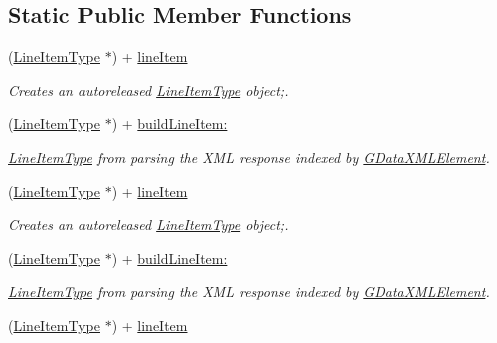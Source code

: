 \subsection*{Static Public Member Functions}
\begin{DoxyCompactItemize}
\item 
(\hyperlink{interface_line_item_type}{LineItemType} $\ast$) + \hyperlink{interface_line_item_type_a3d39c24f1bfd7807333c2a7480beabd5}{lineItem}
\begin{DoxyCompactList}\small\item\em Creates an autoreleased \hyperlink{interface_line_item_type}{LineItemType} object;. \item\end{DoxyCompactList}\item 
(\hyperlink{interface_line_item_type}{LineItemType} $\ast$) + \hyperlink{interface_line_item_type_ab88b17b872d7f5d0cb8875b8bd9bec95}{buildLineItem:}
\begin{DoxyCompactList}\small\item\em \hyperlink{interface_line_item_type}{LineItemType} from parsing the XML response indexed by \hyperlink{interface_g_data_x_m_l_element}{GDataXMLElement}. \item\end{DoxyCompactList}\item 
(\hyperlink{interface_line_item_type}{LineItemType} $\ast$) + \hyperlink{interface_line_item_type_a3d39c24f1bfd7807333c2a7480beabd5}{lineItem}
\begin{DoxyCompactList}\small\item\em Creates an autoreleased \hyperlink{interface_line_item_type}{LineItemType} object;. \item\end{DoxyCompactList}\item 
(\hyperlink{interface_line_item_type}{LineItemType} $\ast$) + \hyperlink{interface_line_item_type_a1c4b1049a9982dd49c15debfad0df9b5}{buildLineItem:}
\begin{DoxyCompactList}\small\item\em \hyperlink{interface_line_item_type}{LineItemType} from parsing the XML response indexed by \hyperlink{interface_g_data_x_m_l_element}{GDataXMLElement}. \item\end{DoxyCompactList}\item 
(\hyperlink{interface_line_item_type}{LineItemType} $\ast$) + \hyperlink{interface_line_item_type_a3d39c24f1bfd7807333c2a7480beabd5}{lineItem}

\end{DoxyCompactItemize}
